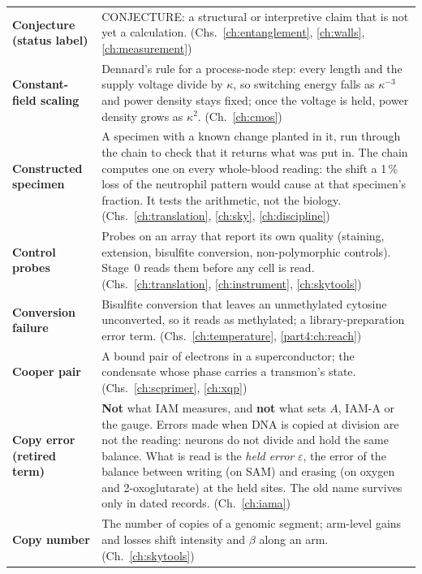 {\begin{longtable}{@{}>{\raggedright\arraybackslash}p{}>{\raggedright\arraybackslash}p{}@{}}
\textbf{Conjecture (status label)} & CONJECTURE: a structural or interpretive claim that is not yet a calculation. {\footnotesize(Chs.~\ref{ch:entanglement}, \ref{ch:walls}, \ref{ch:measurement})}\\[1pt]
\textbf{Constant-field scaling} & Dennard's rule for a process-node step: every length and the supply voltage divide by $\kappa$, so switching energy falls as $\kappa^{-3}$ and power density stays fixed; once the voltage is held, power density grows as $\kappa^2$. {\footnotesize(Ch.~\ref{ch:cmos})}\\[1pt]
\textbf{Constructed specimen} & A specimen with a known change planted in it, run through the chain to check that it returns what was put in. The chain computes one on every whole-blood reading: the shift a 1\,\% loss of the neutrophil pattern would cause at that specimen's fraction. It tests the arithmetic, not the biology. {\footnotesize(Chs.~\ref{ch:translation}, \ref{ch:sky}, \ref{ch:discipline})}\\[1pt]
\textbf{Control probes} & Probes on an array that report its own quality (staining, extension, bisulfite conversion, non-polymorphic controls). Stage~0 reads them before any cell is read. {\footnotesize(Chs.~\ref{ch:translation}, \ref{ch:instrument}, \ref{ch:skytools})}\\[1pt]
\textbf{Conversion failure} & Bisulfite conversion that leaves an unmethylated cytosine unconverted, so it reads as methylated; a library-preparation error term. {\footnotesize(Chs.~\ref{ch:temperature}, \ref{part4:ch:reach})}\\[1pt]
\textbf{Cooper pair} & A bound pair of electrons in a superconductor; the condensate whose phase carries a transmon's state. {\footnotesize(Chs.~\ref{ch:scprimer}, \ref{ch:xqp})}\\[1pt]
\textbf{Copy error (retired term)} & \textbf{Not} what IAM measures, and \textbf{not} what sets $A$, IAM-A or the gauge. Errors made when DNA is copied at division are not the reading: neurons do not divide and hold the same balance. What is read is the \emph{held error} $\varepsilon$, the error of the balance between writing (on SAM) and erasing (on oxygen and 2-oxoglutarate) at the held sites. The old name survives only in dated records. {\footnotesize(Ch.~\ref{ch:iama})}\\[1pt]
\textbf{Copy number} & The number of copies of a genomic segment; arm-level gains and losses shift intensity and $\beta$ along an arm. {\footnotesize(Ch.~\ref{ch:skytools})}\\[1pt]

\end{longtable}}

